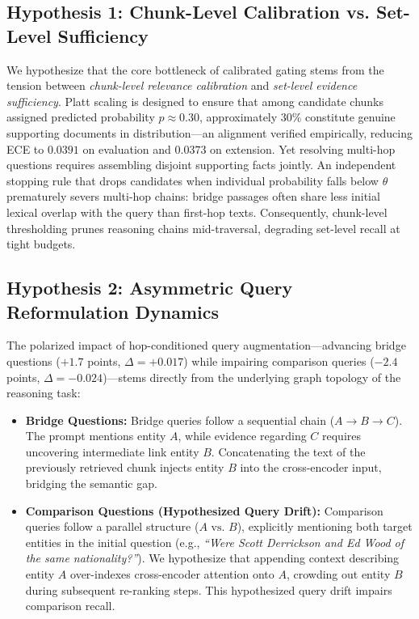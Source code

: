 \documentclass[conference]{IEEEtran}
\begin{document}
\subsection{Hypothesis 1: Chunk-Level Calibration vs. Set-Level Sufficiency}
We hypothesize that the core bottleneck of calibrated gating stems from the tension between \textit{chunk-level relevance calibration} and \textit{set-level evidence sufficiency}. Platt scaling is designed to ensure that among candidate chunks assigned predicted probability $\hat{p} \approx 0.30$, approximately 30\% constitute genuine supporting documents in distribution—an alignment verified empirically, reducing ECE to $0.0391$ on evaluation and $0.0373$ on extension. Yet resolving multi-hop questions requires assembling disjoint supporting facts jointly. An independent stopping rule that drops candidates when individual probability falls below $\theta$ prematurely severs multi-hop chains: bridge passages often share less initial lexical overlap with the query than first-hop texts. Consequently, chunk-level thresholding prunes reasoning chains mid-traversal, degrading set-level recall at tight budgets.

\subsection{Hypothesis 2: Asymmetric Query Reformulation Dynamics}
The polarized impact of hop-conditioned query augmentation—advancing bridge questions ($+1.7$ points, $\Delta = +0.017$) while impairing comparison queries ($-2.4$ points, $\Delta = -0.024$)—stems directly from the underlying graph topology of the reasoning task:
\begin{itemize}\setlength{\itemsep}{1pt}\setlength{\parskip}{0pt}
    \item \textbf{Bridge Questions:} Bridge queries follow a sequential chain ($A \to B \to C$). The prompt mentions entity $A$, while evidence regarding $C$ requires uncovering intermediate link entity $B$. Concatenating the text of the previously retrieved chunk injects entity $B$ into the cross-encoder input, bridging the semantic gap.
    \item \textbf{Comparison Questions (Hypothesized Query Drift):} Comparison queries follow a parallel structure ($A \text{ vs. } B$), explicitly mentioning both target entities in the initial question (e.g., \textit{``Were Scott Derrickson and Ed Wood of the same nationality?''}). We hypothesize that appending context describing entity $A$ over-indexes cross-encoder attention onto $A$, crowding out entity $B$ during subsequent re-ranking steps. This hypothesized query drift impairs comparison recall.
\end{itemize}
\end{document}
